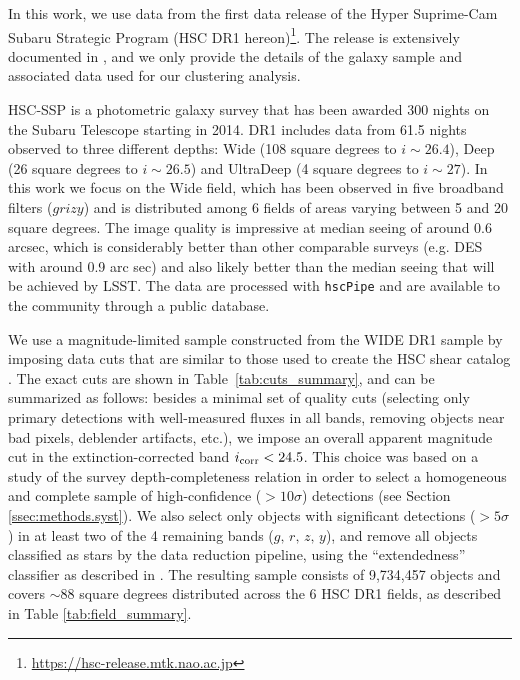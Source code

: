 \documentclass[a4paper,11pt]{article}
\begin{document}
  In this work, we use data from the first data release of the Hyper Suprime-Cam Subaru Strategic Program (HSC DR1 hereon)\footnote{\url{https://hsc-release.mtk.nao.ac.jp}}. The release is extensively documented in \cite{2018PASJ...70S...8A}, and we only provide the details of the galaxy sample and associated data used for our clustering analysis.

  HSC-SSP is a photometric galaxy survey that has been awarded 300 nights on the Subaru Telescope starting in 2014. DR1 includes data from 61.5 nights observed to three different depths: Wide (108 square degrees to $i\sim 26.4$), Deep (26 square degrees to $i\sim26.5$) and UltraDeep (4 square degrees to $i\sim 27$). In this work we focus on the Wide field, which has been observed in five broadband filters ($grizy$) and is distributed among 6 fields  of areas varying between 5 and 20 square degrees. The image quality is impressive at median seeing of around 0.6 arcsec, which is considerably better than other comparable surveys (e.g. DES with around 0.9 arc sec) and also likely better than the median seeing that will be achieved by LSST. The data are processed with \texttt{hscPipe} \cite{2018PASJ...70S...5B} and are available to the community through a public database.
  
  We use a magnitude-limited sample constructed from the WIDE DR1 sample by imposing data cuts that are similar to those used to create the HSC shear catalog \cite{2018PASJ...70S..25M}. The exact cuts are shown in Table~\ref{tab:cuts_summary}, and can be summarized as follows: besides a minimal set of quality cuts (selecting only primary detections with well-measured fluxes in all bands, removing objects near bad pixels, deblender artifacts, etc.), we impose an overall apparent magnitude cut in the extinction-corrected band $i_{\rm corr}<24.5$. This choice was based on a study of the survey depth-completeness relation in order to select a homogeneous and complete sample of high-confidence ($>10\sigma$) detections (see Section \ref{ssec:methods.syst}). We also select only objects with significant detections ($>5\sigma$) in at least two of the 4 remaining bands ($g,\,r,\,z,\,y$), and remove all objects classified as stars by the data reduction pipeline, using the ``extendedness'' classifier as described in \cite{2018PASJ...70S..25M,2018PASJ...70S...5B}. The resulting sample consists of 9,734,457 objects and covers $\sim88$ square degrees distributed across the 6 HSC DR1 fields, as described in Table \ref{tab:field_summary}.
\end{document}
